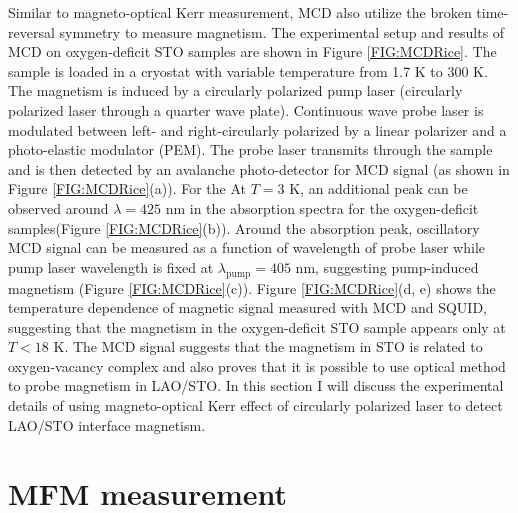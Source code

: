 \documentclass[pdflatex, sectionletters, 12pt]{pittetd}    %
\begin{document}
Similar to magneto-optical Kerr measurement, MCD also utilize the broken time-reversal symmetry to measure magnetism. The experimental setup and results of MCD on oxygen-deficit STO samples are shown in Figure \ref{FIG:MCDRice}. The sample is loaded in a cryostat with variable temperature from 1.7 K to 300 K. The magnetism is induced by a circularly polarized pump laser (circularly polarized laser through a quarter wave plate). Continuous wave probe laser is modulated between left- and right-circularly polarized by a linear polarizer and a photo-elastic modulator (PEM). The probe laser transmits through the sample and is then detected by an avalanche photo-detector for MCD signal (as shown in Figure \ref{FIG:MCDRice}(a)). For the At $T = 3$ K, an additional peak can be observed around $\lambda = 425$ nm in the absorption spectra for the oxygen-deficit samples(Figure \ref{FIG:MCDRice}(b)). Around the absorption peak, oscillatory MCD signal can be measured as a function of wavelength of probe laser while pump laser wavelength is fixed at $\lambda_{\mathrm{pump}} = 405$ nm, suggesting pump-induced magnetism (Figure \ref{FIG:MCDRice}(c)). Figure \ref{FIG:MCDRice}(d, e) shows the temperature dependence of magnetic signal measured with MCD and SQUID, suggesting that the magnetism in the oxygen-deficit STO sample appears only at $T < 18$ K. The MCD signal suggests that the magnetism in STO is related to oxygen-vacancy complex and also proves that it is possible to use optical method to probe magnetism in LAO/STO. In this section I will discuss the experimental details of using magneto-optical Kerr effect of circularly polarized laser to detect LAO/STO interface magnetism.

\section{MFM measurement}
\end{document}
